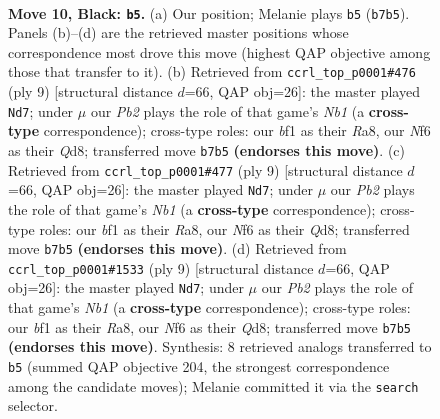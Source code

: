 \documentclass[11pt]{article}
\begin{document}
\clearpage

\begin{figure}[p]\centering
\begin{subfigure}{0.46\textwidth}\centering
\resizebox{\linewidth}{!}{%
\newchessgame
\chessboard[
  setfen={rnq1kb1r/pp3pp1/2p1pnbp/2P5/1P1P1P1P/6N1/P5P1/R1BQKBNR b KQkq - 0 10},
  showmover=false,
  pgfstyle=straightmove, color=movearrow, markmove={b7-b5}
]}
\caption{}
\end{subfigure}\hfill
\begin{subfigure}{0.46\textwidth}\centering
\resizebox{\linewidth}{!}{%
\newchessgame
\chessboard[
  setfen={rn1qkbnr/pp3ppp/2p1p3/3pPb2/3P4/1N6/PPP2PPP/R1BQKBNR b KQkq - 1 5},
  showmover=false,
  pgfstyle=straightmove, color=movearrow, markmove={b8-d7}
]}
\caption{}
\end{subfigure}
\\[4pt]
\begin{subfigure}{0.46\textwidth}\centering
\resizebox{\linewidth}{!}{%
\newchessgame
\chessboard[
  setfen={rn1qkbnr/pp3ppp/2p1p3/3pPb2/3P4/1N6/PPP2PPP/R1BQKBNR b KQkq - 1 5},
  showmover=false,
  pgfstyle=straightmove, color=movearrow, markmove={b8-d7}
]}
\caption{}
\end{subfigure}\hfill
\begin{subfigure}{0.46\textwidth}\centering
\resizebox{\linewidth}{!}{%
\newchessgame
\chessboard[
  setfen={rn1qkbnr/pp3ppp/2p1p3/3pPb2/3P4/1N6/PPP2PPP/R1BQKBNR b KQkq - 1 5},
  showmover=false,
  pgfstyle=straightmove, color=movearrow, markmove={b8-d7}
]}
\caption{}
\end{subfigure}
\caption{\textbf{Move 10, Black: \texttt{b5}.} (a) Our position; Melanie plays \texttt{b5} (\texttt{b7b5}). Panels (b)--(d) are the retrieved master positions whose correspondence most drove this move (highest QAP objective among those that transfer to it). (b) Retrieved from \texttt{ccrl\_top\_p0001\#476} (ply 9) [structural distance $d$=66, QAP obj=26]: the master played \texttt{Nd7}; under $\mu$ our \emph{Pb2} plays the role of that game's \emph{Nb1} (a \textbf{cross-type} correspondence); cross-type roles: our \emph{b}f1 as their \emph{R}a8, our \emph{N}f6 as their \emph{Q}d8; transferred move \texttt{b7b5} \textbf{(endorses this move)}. (c) Retrieved from \texttt{ccrl\_top\_p0001\#477} (ply 9) [structural distance $d$=66, QAP obj=26]: the master played \texttt{Nd7}; under $\mu$ our \emph{Pb2} plays the role of that game's \emph{Nb1} (a \textbf{cross-type} correspondence); cross-type roles: our \emph{b}f1 as their \emph{R}a8, our \emph{N}f6 as their \emph{Q}d8; transferred move \texttt{b7b5} \textbf{(endorses this move)}. (d) Retrieved from \texttt{ccrl\_top\_p0001\#1533} (ply 9) [structural distance $d$=66, QAP obj=26]: the master played \texttt{Nd7}; under $\mu$ our \emph{Pb2} plays the role of that game's \emph{Nb1} (a \textbf{cross-type} correspondence); cross-type roles: our \emph{b}f1 as their \emph{R}a8, our \emph{N}f6 as their \emph{Q}d8; transferred move \texttt{b7b5} \textbf{(endorses this move)}. Synthesis: 8 retrieved analogs transferred to \texttt{b5} (summed QAP objective 204, the strongest correspondence among the candidate moves); Melanie committed it via the \texttt{search} selector.}
\label{fig:thought-m19}
\end{figure}
\end{document}
